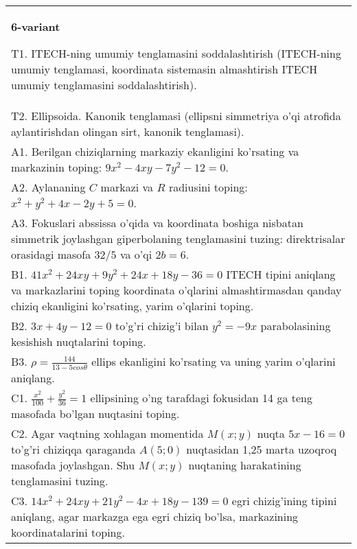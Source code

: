 \documentclass{article}
\begin{document}
\begin{tabular}{m{17cm}}
\textbf{6-variant}
\newline

T1. ITECH-ning umumiy tenglamasini soddalashtirish (ITECH-ning umumiy tenglamasi, koordinata sistemasin almashtirish ITECH umumiy tenglamasini soddalashtirish).\\

T2. Ellipsoida. Kanonik tenglamasi (ellipsni simmetriya o'qi atrofida aylantirishdan olingan sirt, kanonik tenglamasi).\\

A1. Berilgan chiziqlarning markaziy ekanligini ko'rsating va markazinin toping: $9x^{2}-4xy-7y^{2}-12=0$.\\

A2. Aylananing $C$ markazi va $R$ radiusini toping: $x^2+y^2+4x-2y+5=0$.\\

A3. Fokuslari abssissa o'qida va koordinata boshiga nisbatan simmetrik joylashgan giperbolaning tenglamasini tuzing: direktrisalar orasidagi masofa $32/5$ va o'qi $2b=6$.\\

B1. $41x^{2} + 24xy + 9y^{2} + 24x + 18y - 36 = 0$ ITECH tipini aniqlang va markazlarini toping koordinata o'qlarini almashtirmasdan qanday chiziq ekanligini ko'rsating, yarim o'qlarini toping.  \\

B2. $3x + 4y - 12 = 0$ to'g'ri chizig'i bilan $y^{2} = - 9x$ parabolasining kesishish nuqtalarini toping.  \\

B3. $\rho = \frac{144}{13 - 5cos\theta}$ ellips ekanligini ko'rsating va uning yarim o'qlarini aniqlang.\\

C1. $\frac{x^{2}}{100} + \frac{y^{2}}{36} = 1$ ellipsining o'ng tarafdagi fokusidan 14 ga teng masofada bo'lgan nuqtasini toping.  \\

C2. Agar vaqtning xohlagan momentida $M(x;y)$ nuqta $5x - 16 = 0$ to'g'ri chiziqqa qaraganda $A(5;0)$ nuqtasidan 1,25 marta uzoqroq masofada joylashgan. Shu $M(x;y)$ nuqtaning harakatining tenglamasini tuzing.  \\

C3. $14x^{2} + 24xy + 21y^{2} - 4x + 18y - 139 = 0$ egri chizig'ining tipini aniqlang, agar markazga ega egri chiziq bo'lsa, markazining koordinatalarini toping.  \\

\end{tabular}
\vspace{1cm}
\end{document}
